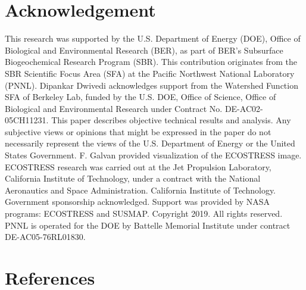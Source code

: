 \documentclass[preprint,review, 12pt]{elsarticle}
\begin{document}
\section{Acknowledgement}
This research was supported by the U.S. Department of Energy (DOE), Office of Biological and Environmental Research (BER), as part of BER's Subsurface Biogeochemical Research Program (SBR). This contribution originates from the SBR Scientific Focus Area (SFA) at the Pacific Northwest National Laboratory (PNNL). Dipankar Dwivedi acknowledges support from the Watershed Function SFA of Berkeley Lab, funded by the U.S. DOE, Office of Science, Office of Biological and Environmental Research under Contract No. DE-AC02-05CH11231. This paper describes objective technical results and analysis. Any subjective views or opinions that might be expressed in the paper do not necessarily represent the views of the U.S. Department of Energy or the United States Government. F. Galvan provided visualization of the ECOSTRESS image. ECOSTRESS research was carried out at the Jet Propulsion Laboratory, California Institute of Technology, under a contract with the National Aeronautics and Space Administration. California Institute of Technology. Government sponsorship acknowledged. Support was provided by NASA programs: ECOSTRESS and SUSMAP. Copyright 2019. All rights reserved. PNNL is operated for the DOE by Battelle Memorial Institute under contract DE-AC05-76RL01830.

\section{References}
%
% 
% 
% 
% 
% 
% 
% 
% 
% 
% 
% 








\end{document}
